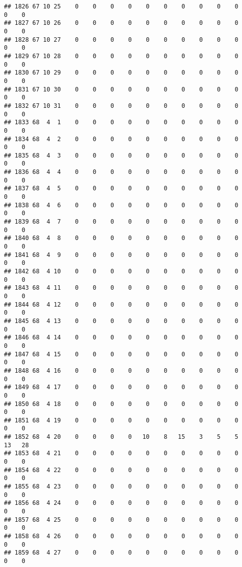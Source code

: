 \documentclass[]{article}
\begin{document}
\begin{verbatim}
## 1826 67 10 25    0    0    0    0    0    0    0    0    0    0    0    0
## 1827 67 10 26    0    0    0    0    0    0    0    0    0    0    0    0
## 1828 67 10 27    0    0    0    0    0    0    0    0    0    0    0    0
## 1829 67 10 28    0    0    0    0    0    0    0    0    0    0    0    0
## 1830 67 10 29    0    0    0    0    0    0    0    0    0    0    0    0
## 1831 67 10 30    0    0    0    0    0    0    0    0    0    0    0    0
## 1832 67 10 31    0    0    0    0    0    0    0    0    0    0    0    0
## 1833 68  4  1    0    0    0    0    0    0    0    0    0    0    0    0
## 1834 68  4  2    0    0    0    0    0    0    0    0    0    0    0    0
## 1835 68  4  3    0    0    0    0    0    0    0    0    0    0    0    0
## 1836 68  4  4    0    0    0    0    0    0    0    0    0    0    0    0
## 1837 68  4  5    0    0    0    0    0    0    0    0    0    0    0    0
## 1838 68  4  6    0    0    0    0    0    0    0    0    0    0    0    0
## 1839 68  4  7    0    0    0    0    0    0    0    0    0    0    0    0
## 1840 68  4  8    0    0    0    0    0    0    0    0    0    0    0    0
## 1841 68  4  9    0    0    0    0    0    0    0    0    0    0    0    0
## 1842 68  4 10    0    0    0    0    0    0    0    0    0    0    0    0
## 1843 68  4 11    0    0    0    0    0    0    0    0    0    0    0    0
## 1844 68  4 12    0    0    0    0    0    0    0    0    0    0    0    0
## 1845 68  4 13    0    0    0    0    0    0    0    0    0    0    0    0
## 1846 68  4 14    0    0    0    0    0    0    0    0    0    0    0    0
## 1847 68  4 15    0    0    0    0    0    0    0    0    0    0    0    0
## 1848 68  4 16    0    0    0    0    0    0    0    0    0    0    0    0
## 1849 68  4 17    0    0    0    0    0    0    0    0    0    0    0    0
## 1850 68  4 18    0    0    0    0    0    0    0    0    0    0    0    0
## 1851 68  4 19    0    0    0    0    0    0    0    0    0    0    0    0
## 1852 68  4 20    0    0    0    0   10    8   15    3    5    5   13   28
## 1853 68  4 21    0    0    0    0    0    0    0    0    0    0    0    0
## 1854 68  4 22    0    0    0    0    0    0    0    0    0    0    0    0
## 1855 68  4 23    0    0    0    0    0    0    0    0    0    0    0    0
## 1856 68  4 24    0    0    0    0    0    0    0    0    0    0    0    0
## 1857 68  4 25    0    0    0    0    0    0    0    0    0    0    0    0
## 1858 68  4 26    0    0    0    0    0    0    0    0    0    0    0    0
## 1859 68  4 27    0    0    0    0    0    0    0    0    0    0    0    0

\end{verbatim}
\end{document}
